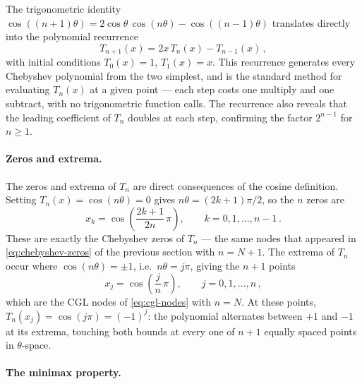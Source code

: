 The trigonometric identity
$\cos((n+1)\theta) = 2\cos\theta\,\cos(n\theta) - \cos((n-1)\theta)$
translates directly into the polynomial recurrence
%
\begin{equation}
  T_{n+1}(x) = 2x\,T_n(x) - T_{n-1}(x) \,,
  \label{eq:chebyshev-recurrence}
\end{equation}
%
with initial conditions $T_0(x) = 1$, $T_1(x) = x$.  This
recurrence generates every Chebyshev polynomial from the two
simplest, and is the standard method for evaluating $T_n(x)$ at a
given point --- each step costs one multiply and one subtract, with no
trigonometric function calls.  The recurrence also reveals that the
leading coefficient of $T_n$ doubles at each step, confirming the
factor $2^{n-1}$ for $n \geq 1$.

\paragraph{Zeros and extrema.}

The zeros and extrema of $T_n$ are direct consequences of the
cosine definition.  Setting $T_n(x) = \cos(n\theta) = 0$ gives
$n\theta = (2k+1)\pi/2$, so the $n$ zeros are
%
\begin{equation}
  x_k = \cos\!\left(\frac{2k + 1}{2n}\,\pi\right) ,
  \qquad k = 0, 1, \ldots, n-1 \,.
  \label{eq:chebyshev-zeros-Tn}
\end{equation}
%
These are exactly the Chebyshev zeros of $T_n$ --- the same nodes
that appeared in \cref{eq:chebyshev-zeros} of the previous section
with $n = N + 1$.  The extrema of $T_n$ occur where
$\cos(n\theta) = \pm 1$, i.e.\ $n\theta = j\pi$, giving
the $n + 1$ points
%
\begin{equation}
  x_j = \cos\!\left(\frac{j}{n}\,\pi\right) ,
  \qquad j = 0, 1, \ldots, n \,,
  \label{eq:chebyshev-extrema}
\end{equation}
%
which are the CGL nodes of \cref{eq:cgl-nodes} with $n = N$.
At these points, $T_n(x_j) = \cos(j\pi) = (-1)^j$: the polynomial
alternates between $+1$ and $-1$ at its extrema, touching both
bounds at every one of $n + 1$ equally spaced points in
$\theta$-space.

\paragraph{The minimax property.}

